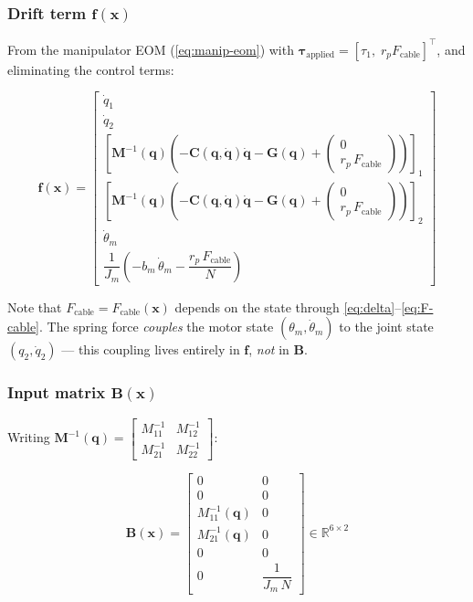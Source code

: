 \documentclass[11pt, a4paper]{article}
\newcommand{\bq}{\bm{q}}
\newcommand{\bx}{\bm{x}}
\newcommand{\btau}{\bm{\tau}}
\newcommand{\bM}{\bm{M}}
\newcommand{\bC}{\bm{C}}
\newcommand{\bG}{\bm{G}}
\newcommand{\bB}{\bm{B}}
\newcommand{\R}{\mathbb{R}}
\begin{document}
\subsubsection{Drift term \texorpdfstring{$\bm{f}(\bx)$}{f(x)}}

From the manipulator EOM (\ref{eq:manip-eom}) with
$\btau_\text{applied} = [\tau_1, \; r_p F_\text{cable}]^\top$,
and eliminating the control terms:

\begin{equation}
\label{eq:f}
\bm{f}(\bx) =
\begin{bmatrix}
\dot{q}_1   \\[2pt]
\dot{q}_2   \\[2pt]
\left[\bM^{-1}(\bq)\left(-\bC(\bq,\dot{\bq})\dot{\bq} - \bG(\bq)
  + \begin{pmatrix} 0 \\ r_p\,F_\text{cable} \end{pmatrix}\right)\right]_1   \\[4pt]
\left[\bM^{-1}(\bq)\left(-\bC(\bq,\dot{\bq})\dot{\bq} - \bG(\bq)
  + \begin{pmatrix} 0 \\ r_p\,F_\text{cable} \end{pmatrix}\right)\right]_2   \\[4pt]
\dot{\theta}_m   \\[2pt]
\dfrac{1}{J_m}\left(-b_m\,\dot{\theta}_m - \dfrac{r_p\,F_\text{cable}}{N}\right)
\end{bmatrix}
\end{equation}

Note that $F_\text{cable} = F_\text{cable}(\bx)$ depends on the state
through \eqref{eq:delta}--\eqref{eq:F-cable}.
The spring force \emph{couples} the motor state $(\theta_m, \dot{\theta}_m)$
to the joint state $(q_2, \dot{q}_2)$ --- this coupling lives entirely in
$\bm{f}$, \emph{not} in $\bB$.

\subsubsection{Input matrix \texorpdfstring{$\bB(\bx)$}{B(x)}}

Writing $\bM^{-1}(\bq) = \begin{bmatrix} M^{-1}_{11} & M^{-1}_{12} \\
M^{-1}_{21} & M^{-1}_{22} \end{bmatrix}$:

\begin{equation}
\label{eq:B}
\bB(\bx) =
\begin{bmatrix}
0           & 0                \\
0           & 0                \\
M^{-1}_{11}(\bq) & 0          \\
M^{-1}_{21}(\bq) & 0          \\
0           & 0                \\
0           & \dfrac{1}{J_m\,N}
\end{bmatrix}
\in \R^{6 \times 2}
\end{equation}
\end{document}
